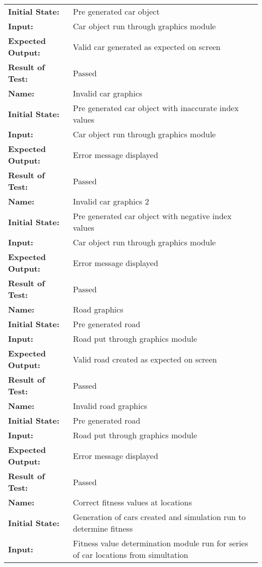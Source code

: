 \documentclass[12pt, titlepage]{article}
\begin{document}
\begin{center}
\begin{longtable}{ l | p{10cm} }
\textbf{Initial State:} & Pre generated car object\\
\textbf{Input:} & Car object run through graphics module\\
\textbf{Expected Output:} & Valid car generated as expected on screen\\[0.6em]
\textbf{Result of Test:} & Passed\\
\hline
\rule{0pt}{1.5em}\textbf{Name:} & Invalid car graphics\\
\textbf{Initial State:} & Pre generated car object with inaccurate index values\\
\textbf{Input:} & Car object run through graphics module\\
\textbf{Expected Output:} & Error message displayed\\[0.6em]
\textbf{Result of Test:} & Passed\\
\hline
\rule{0pt}{1.5em}\textbf{Name:} & Invalid car graphics 2\\
\textbf{Initial State:} & Pre generated car object with negative index values\\
\textbf{Input:} & Car object run through graphics module\\
\textbf{Expected Output:} & Error message displayed\\[0.6em]
\textbf{Result of Test:} & Passed\\
\hline
\rule{0pt}{1.5em}\textbf{Name:} & Road graphics\\
\textbf{Initial State:} & Pre generated road\\
\textbf{Input:} & Road put through graphics module\\
\textbf{Expected Output:} & Valid road created as expected on screen\\[0.6em]
\textbf{Result of Test:} & Passed\\
\hline
\rule{0pt}{1.5em}\textbf{Name:} & Invalid road graphics\\
\textbf{Initial State:} & Pre generated road\\
\textbf{Input:} & Road put through graphics module\\
\textbf{Expected Output:} & Error message displayed\\[0.6em]
\textbf{Result of Test:} & Passed\\
\hline
\rule{0pt}{1.5em}\textbf{Name:} & Correct fitness values at locations\\
\textbf{Initial State:} & Generation of cars created and simulation run to determine fitness\\
\textbf{Input:} & Fitness value determination module run for series of car locations from simultation\\

\end{longtable}
\end{center}
\end{document}
